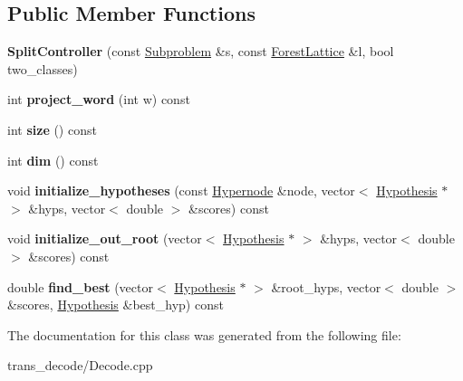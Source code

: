 \subsection*{Public Member Functions}
\begin{DoxyCompactItemize}
\item 
\hypertarget{class_split_controller_a511e733b586a24c2cad5ba16a6cb381b}{
{\bfseries SplitController} (const \hyperlink{class_subproblem}{Subproblem} \&s, const \hyperlink{class_forest_lattice}{ForestLattice} \&l, bool two\_\-classes)}
\label{class_split_controller_a511e733b586a24c2cad5ba16a6cb381b}

\item 
\hypertarget{class_split_controller_ac01bf4220c60c35f6862160dc7fcacc7}{
int {\bfseries project\_\-word} (int w) const }
\label{class_split_controller_ac01bf4220c60c35f6862160dc7fcacc7}

\item 
\hypertarget{class_split_controller_a272757bbbfaa9af9d2ee2262b03ef131}{
int {\bfseries size} () const }
\label{class_split_controller_a272757bbbfaa9af9d2ee2262b03ef131}

\item 
\hypertarget{class_split_controller_ad2aeeafdc31d48526be15a1b1a2e9931}{
int {\bfseries dim} () const }
\label{class_split_controller_ad2aeeafdc31d48526be15a1b1a2e9931}

\item 
\hypertarget{class_split_controller_a6ac91d8fd5fef735c6572c420a05bda4}{
void {\bfseries initialize\_\-hypotheses} (const \hyperlink{class_scarab_1_1_h_g_1_1_hypernode}{Hypernode} \&node, vector$<$ \hyperlink{struct_scarab_1_1_h_g_1_1_hypothesis}{Hypothesis} $\ast$ $>$ \&hyps, vector$<$ double $>$ \&scores) const }
\label{class_split_controller_a6ac91d8fd5fef735c6572c420a05bda4}

\item 
\hypertarget{class_split_controller_a58e535837326d733c98a193f2c7584c6}{
void {\bfseries initialize\_\-out\_\-root} (vector$<$ \hyperlink{struct_scarab_1_1_h_g_1_1_hypothesis}{Hypothesis} $\ast$ $>$ \&hyps, vector$<$ double $>$ \&scores) const }
\label{class_split_controller_a58e535837326d733c98a193f2c7584c6}

\item 
\hypertarget{class_split_controller_a2138b9bac43d19896f2bff71a619e9af}{
double {\bfseries find\_\-best} (vector$<$ \hyperlink{struct_scarab_1_1_h_g_1_1_hypothesis}{Hypothesis} $\ast$ $>$ \&root\_\-hyps, vector$<$ double $>$ \&scores, \hyperlink{struct_scarab_1_1_h_g_1_1_hypothesis}{Hypothesis} \&best\_\-hyp) const }
\label{class_split_controller_a2138b9bac43d19896f2bff71a619e9af}

\end{DoxyCompactItemize}


The documentation for this class was generated from the following file:\begin{DoxyCompactItemize}
\item 
trans\_\-decode/Decode.cpp\end{DoxyCompactItemize}
